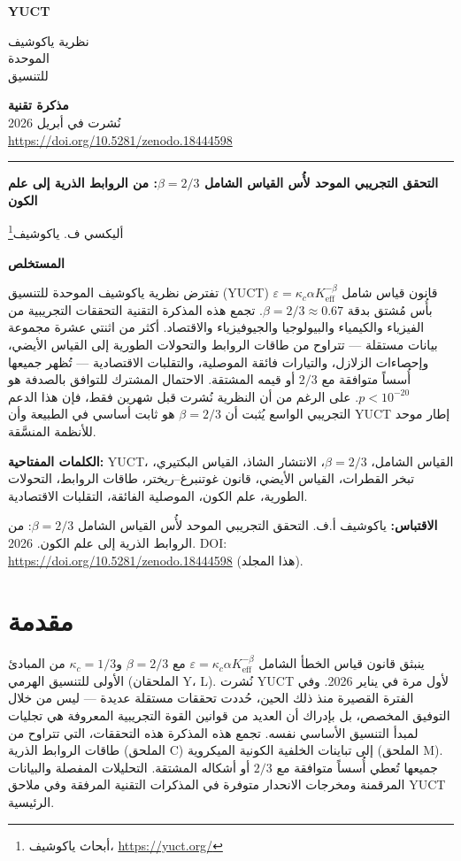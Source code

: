 \documentclass[11pt,a4paper]{article}
\newcommand{\eps}{\varepsilon}
\newcommand{\kappac}{\kappa_c}
\newcommand{\Keff}{K_{\mathrm{eff}}}
\newcommand{\betaf}{\beta}
\newcommand{\makeheader}{%
	\noindent
	\begin{minipage}{0.17\textwidth}
		\raggedright
		{\sffamily\bfseries\color{skyblue}\fontsize{46}{46}\selectfont YUCT}%
	\end{minipage}%
	\hspace{30pt}
	\begin{minipage}{0.32\textwidth}
		\raggedright
		{\sffamily\fontsize{11}{13}\selectfont نظرية ياكوشيف\\ الموحدة\\ للتنسيق}%
	\end{minipage}%
	\hfill
	\begin{minipage}{0.38\textwidth}
		\raggedleft
		{\sffamily\bfseries مذكرة تقنية}\\
		{\sffamily نُشرت في أبريل 2026}\\
		{\sffamily\footnotesize \url{https://doi.org/10.5281/zenodo.18444598}}%
	\end{minipage}
	\par\vspace{5pt}
	\noindent\textcolor{gold}{\rule{\textwidth}{1.6pt}}
	\par\vspace{0pt}
}
\begin{document}
	\thispagestyle{firstpage}
	\makeheader
	
	\vspace{0cm}
	{\LARGE\bfseries التحقق التجريبي الموحد لأُس القياس الشامل \(\betaf = 2/3\): من الروابط الذرية إلى علم الكون \par}
	\vspace{0.2cm}
	
	{\large أليكسي ف. ياكوشيف\footnote{أبحاث ياكوشيف، \url{https://yuct.org/}}} \\
	\vspace{0.0cm}
	
	{\color{darkblue}\textbf{\LARGE المستخلص}} \par
	{\large
		\noindent
		تفترض نظرية ياكوشيف الموحدة للتنسيق (YUCT) قانون قياس شامل \(\eps = \kappac \alpha \Keff^{-\betaf}\) بأُس مُشتق بدقة \(\betaf = 2/3 \approx 0.67\). تجمع هذه المذكرة التقنية التحققات التجريبية من الفيزياء والكيمياء والبيولوجيا والجيوفيزياء والاقتصاد. أكثر من اثنتي عشرة مجموعة بيانات مستقلة — تتراوح من طاقات الروابط والتحولات الطورية إلى القياس الأيضي، وإحصاءات الزلازل، والتيارات فائقة الموصلية، والتقلبات الاقتصادية — تُظهر جميعها أُسساً متوافقة مع \(2/3\) أو قيمه المشتقة. الاحتمال المشترك للتوافق بالصدفة هو \(p < 10^{-20}\). على الرغم من أن النظرية نُشرت قبل شهرين فقط، فإن هذا الدعم التجريبي الواسع يُثبت أن \(\betaf = 2/3\) هو ثابت أساسي في الطبيعة وأن YUCT إطار موحد للأنظمة المنسَّقة.}
	
	\vspace{0.1cm}
	\noindent
	{\color{darkblue}\textbf{الكلمات المفتاحية:}} YUCT، القياس الشامل، \(\beta = 2/3\)، الانتشار الشاذ، القياس البكتيري، تبخر القطرات، القياس الأيضي، قانون غوتنبرغ–ريختر، طاقات الروابط، التحولات الطورية، علم الكون، الموصلية الفائقة، التقلبات الاقتصادية.
	
	\vspace{0.1cm}
	\noindent
	{\color{darkblue}\textbf{الاقتباس:}} ياكوشيف أ.ف. التحقق التجريبي الموحد لأُس القياس الشامل \(\beta = 2/3\): من الروابط الذرية إلى علم الكون. 2026. DOI: \url{https://doi.org/10.5281/zenodo.18444598} (هذا المجلد).
	
	\vspace{0.4cm}
	
	
	\section{مقدمة}
	
	ينبثق قانون قياس الخطأ الشامل \(\eps = \kappac \alpha \Keff^{-\betaf}\) مع \(\betaf = 2/3\) و\(\kappac = 1/3\) من المبادئ الأولى للتنسيق الهرمي (الملحقان Y، L). نُشرت YUCT لأول مرة في يناير 2026. وفي الفترة القصيرة منذ ذلك الحين، حُددت تحققات مستقلة عديدة — ليس من خلال التوفيق المخصص، بل بإدراك أن العديد من قوانين القوة التجريبية المعروفة هي تجليات لمبدأ التنسيق الأساسي نفسه. تجمع هذه المذكرة هذه التحققات، التي تتراوح من طاقات الروابط الذرية (الملحق C) إلى تباينات الخلفية الكونية الميكروية (الملحق M). جميعها تُعطي أُسساً متوافقة مع \(2/3\) أو أشكاله المشتقة. التحليلات المفصلة والبيانات المرقمنة ومخرجات الانحدار متوفرة في المذكرات التقنية المرفقة \cite{TN1,TN2,TN3,TN4,TN5} وفي ملاحق YUCT الرئيسية.
	
\end{document}
